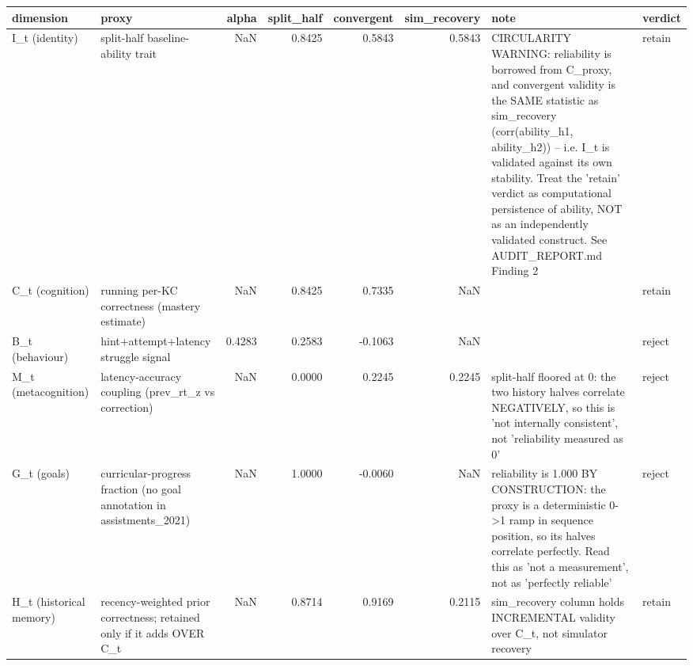 \begin{tabular}{llrrrrll}
\toprule
dimension & proxy & alpha & split\_half & convergent & sim\_recovery & note & verdict \\
\midrule
I\_t (identity) & split-half baseline-ability trait & NaN & 0.8425 & 0.5843 & 0.5843 & CIRCULARITY WARNING: reliability is borrowed from C\_proxy, and convergent validity is the SAME statistic as sim\_recovery (corr(ability\_h1, ability\_h2)) -- i.e. I\_t is validated against its own stability. Treat the 'retain' verdict as computational persistence of ability, NOT as an independently validated construct. See AUDIT\_REPORT.md Finding 2 & retain \\
C\_t (cognition) & running per-KC correctness (mastery estimate) & NaN & 0.8425 & 0.7335 & NaN &  & retain \\
B\_t (behaviour) & hint+attempt+latency struggle signal & 0.4283 & 0.2583 & -0.1063 & NaN &  & reject \\
M\_t (metacognition) & latency-accuracy coupling (prev\_rt\_z vs correction) & NaN & 0.0000 & 0.2245 & 0.2245 & split-half floored at 0: the two history halves correlate NEGATIVELY, so this is 'not internally consistent', not 'reliability measured as 0' & reject \\
G\_t (goals) & curricular-progress fraction (no goal annotation in assistments\_2021) & NaN & 1.0000 & -0.0060 & NaN & reliability is 1.000 BY CONSTRUCTION: the proxy is a deterministic 0->1 ramp in sequence position, so its halves correlate perfectly. Read this as 'not a measurement', not as 'perfectly reliable' & reject \\
H\_t (historical memory) & recency-weighted prior correctness; retained only if it adds OVER C\_t & NaN & 0.8714 & 0.9169 & 0.2115 & sim\_recovery column holds INCREMENTAL validity over C\_t, not simulator recovery & retain \\
\bottomrule
\end{tabular}
